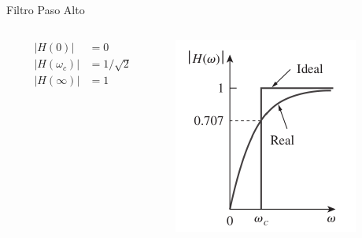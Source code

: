 \documentclass[xcolor={usenames,svgnames,dvipsnames}]{beamer}
\begin{document}
\begin{frame}[label={sec:orgfbd278c}]{Filtro Paso Alto}
\begin{columns}
\begin{column}{0.3\columnwidth}
\begin{align*}
  |H(0)| &= 0\\
  |H(\omega_c)| &= 1/\sqrt{2}\\
  |H(\infty)| &= 1
\end{align*}
\end{column}

\begin{column}{0.7\columnwidth}
\begin{center}
\includegraphics[width=.9\linewidth]{figs/Filtro_PasoAlto.pdf}
\end{center}
\end{column}
\end{columns}
\end{frame}
\end{document}
